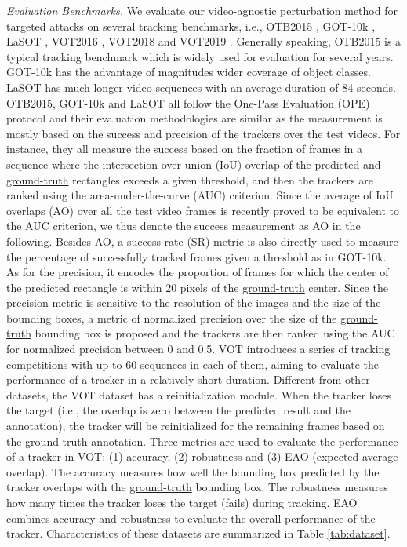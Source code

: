 \documentclass[journal]{IEEEtran}
\newcommand{\ie}{i.e.}
\begin{document}
\textit{Evaluation Benchmarks.} We evaluate our video-agnostic perturbation method for targeted attacks on several tracking benchmarks, \ie, OTB2015 \cite{OTB}, GOT-10k \cite{GOT-10k}, LaSOT \cite{LaSOT}, VOT2016 \cite{VOT2016}, VOT2018 \cite{VOT2018} and VOT2019 \cite{VOT2019}.
Generally speaking, OTB2015 is a typical tracking benchmark which is widely used for evaluation for several years. GOT-10k has the advantage of magnitudes wider coverage of object classes. LaSOT has much longer video sequences with an average duration of 84 seconds. OTB2015, GOT-10k and LaSOT all follow the One-Pass Evaluation (OPE) protocol and their evaluation methodologies are similar as the measurement is mostly based on the success and precision of the trackers over the test videos. For instance, they all measure the success based on the fraction of frames in a sequence where the intersection-over-union (IoU) overlap of the predicted and \uline{ground-truth} rectangles exceeds a given threshold, and then the trackers are ranked using the area-under-the-curve (AUC) criterion. Since the average of IoU overlaps (AO) over all the test video frames is recently proved to be equivalent to the AUC criterion, we thus denote the success measurement as AO in the following. Besides AO, a success rate (SR) metric is also directly used to measure the percentage of successfully tracked frames given a threshold as in GOT-10k. As for the precision, it encodes the proportion of frames for which the center of the predicted rectangle is within 20 pixels of the \uline{ground-truth} center. Since the precision metric is sensitive to the resolution of the images and the size of the bounding boxes, a metric of normalized precision over the size of the \uline{ground-truth} bounding box is proposed and the trackers are then ranked using the AUC for normalized precision between 0 and 0.5. VOT \cite{VOT2016,VOT2018,VOT2019} introduces a series of tracking competitions with up to 60 sequences in each of them, aiming to evaluate the performance of a tracker in a relatively short duration. Different from other datasets, the VOT dataset has a reinitialization module. When the tracker loses the target (\ie, the overlap is zero between the predicted result and the annotation), the tracker will be reinitialized for the remaining frames based on the \uline{ground-truth} annotation. Three metrics are used to evaluate the performance of a tracker in VOT: (1) accuracy, (2) robustness and (3) EAO (expected average overlap). The accuracy measures how well the bounding box predicted by the tracker overlaps with the \uline{ground-truth} bounding box. The robustness measures how many times the tracker loses the target (fails) during tracking. EAO combines accuracy and robustness to evaluate the overall performance of the tracker. Characteristics of these datasets are summarized in Table \ref{tab:dataset}.
\end{document}
